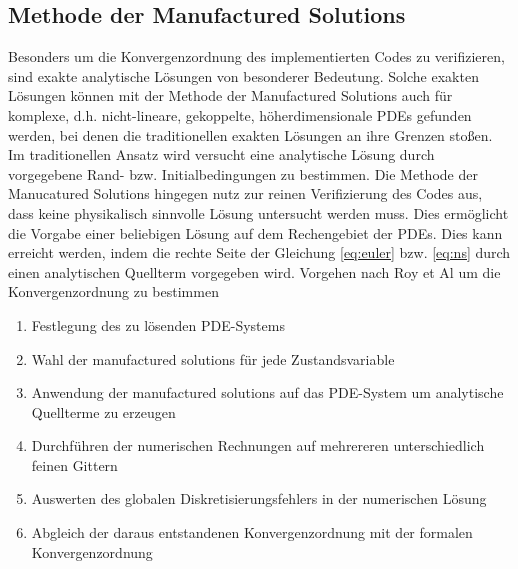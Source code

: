 \subsection{Methode der Manufactured Solutions}
Besonders um die Konvergenzordnung des implementierten Codes zu verifizieren, sind exakte analytische Lösungen von besonderer Bedeutung. Solche exakten Lösungen können mit der Methode der Manufactured Solutions auch für komplexe, d.h. nicht-lineare, gekoppelte, höherdimensionale PDEs gefunden werden, bei denen die traditionellen exakten Lösungen an ihre Grenzen stoßen. Im traditionellen Ansatz wird versucht eine analytische Lösung durch vorgegebene Rand- bzw. Initialbedingungen zu bestimmen. Die Methode der Manucatured Solutions hingegen nutz zur reinen Verifizierung des Codes aus, dass keine physikalisch sinnvolle Lösung untersucht werden muss. Dies ermöglicht die Vorgabe einer beliebigen Lösung auf dem Rechengebiet der PDEs. Dies kann erreicht werden, indem die rechte Seite der Gleichung \ref{eq:euler} bzw. \ref{eq:ns} durch einen analytischen Quellterm vorgegeben wird.
Vorgehen nach Roy et Al \cite{roy} um die Konvergenzordnung zu bestimmen
\begin{enumerate}
	\item Festlegung des zu lösenden PDE-Systems
	\item Wahl der manufactured solutions für jede Zustandsvariable
	\item Anwendung der manufactured solutions auf das PDE-System um analytische Quellterme zu erzeugen
	\item Durchführen der numerischen Rechnungen auf mehrereren unterschiedlich feinen Gittern
	\item Auswerten des globalen Diskretisierungsfehlers in der numerischen Lösung
	\item Abgleich der daraus entstandenen Konvergenzordnung mit der formalen Konvergenzordnung
\end{enumerate}

